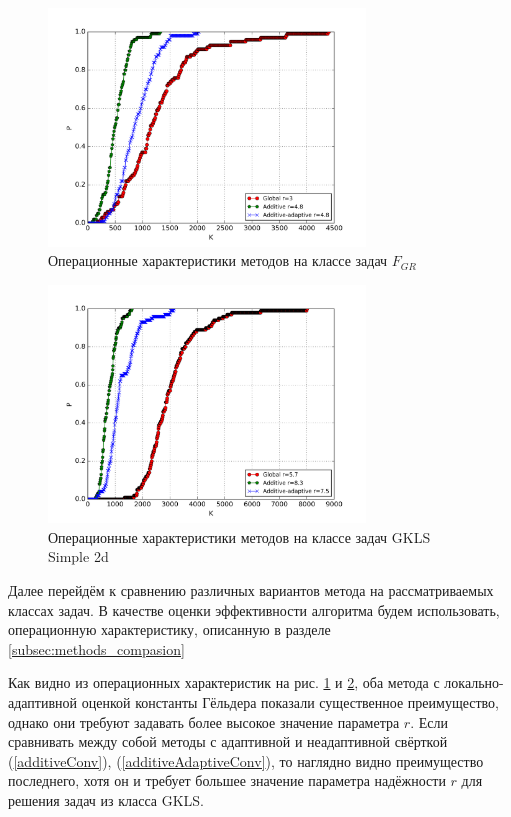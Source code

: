 \begin{figure}[ht]
    \center
    \includegraphics[width=0.75\textwidth]{images/grishagin.png}
    \caption{Операционные характеристики методов на классе задач \(F_{GR}\)}
    \label{fig:grishh_op}
\end{figure}

\begin{figure}[H]
  \center
  \includegraphics[width=0.75\textwidth]{images/gkls-s.png}
  \caption{Операционные характеристики методов на классе задач GKLS Simple 2d}
  \label{fig:gkls_op}
\end{figure}

Далее перейдём к сравнению различных вариантов метода на рассматриваемых классах задач.
В качестве оценки эффективности алгоритма будем использовать, операционную характеристику,
описанную в разделе \ref{subsec:methods_compasion}

Как видно из операционных характеристик на рис. \ref{fig:grishh_op} и \ref{fig:gkls_op},
оба метода с локально-адаптивной оценкой константы Гёльдера показали существенное преимущество, однако они требуют
задавать более высокое значение параметра \(r\). Если сравнивать между собой методы с
адаптивной и неадаптивной свёрткой (\ref{additiveConv}), (\ref{additiveAdaptiveConv}), то наглядно видно преимущество последнего,
хотя он и требует большее значение параметра надёжности \(r\) для решения задач из класса GKLS.

